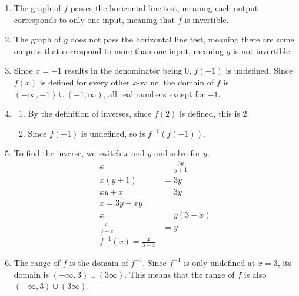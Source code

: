 \documentclass[noauthor]{ximera}
\begin{document}
\begin{problem}
\begin{explanation}
\begin{enumerate}
    \item The graph of \(f\) passes the horizontal line test, meaning each output corresponds to only one input, meaning that \(f\) is invertible.
    \item The graph of \(g\) does not pass the horizontal line test, meaning there are some outputs that correspond to more than one input, meaning \(g\) is not invertible.
    \item Since \(x = -1\) results in the denominator being 0, \(f(-1)\) is undefined. Since \(f(x)\) is defined for every other \(x\)-value,
    the domain of \(f\) is \((-\infty, -1) \cup (-1, \infty)\), all real numbers except for \(-1\).
    \item \begin{enumerate}
        \item By the definition of inverses, since \(f(2)\) is defined, this is 2.
        \item Since \(f(-1)\) is undefined, so is \(f^{-1}(f(-1))\).
    \end{enumerate}
    \item To find the inverse, we switch \(x\) and \(y\) and solve for \(y\).
    \begin{align*}
        x & = \frac{3y}{y + 1} \\
        x(y + 1) & = 3y \\
        xy + x & = 3y \\
        x  = 3y - xy \\
        x & = y(3 - x) \\
        \frac{x}{3 - x} & = y \\
        f^{-1}(x) = \frac{x}{3 - x}
    \end{align*}
    \item The range of \(f\) is the domain of \(f^{-1}\). Since \(f^{-1}\) is only undefined at \(x = 3\), its domain is \((-\infty, 3) \cup (3 \infty)\).
    This means that the range of \(f\) is also  \((-\infty, 3) \cup (3 \infty)\).
\end{enumerate}
\end{explanation}
\end{problem}
 
 
 
\end{document}
